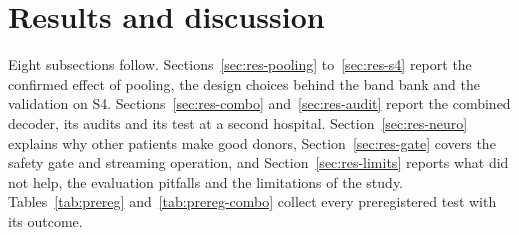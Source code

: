 \documentclass{ieeeaccess}
\begin{document}
\section{Results and discussion}\label{sec:results}

Eight subsections follow. Sections~\ref{sec:res-pooling} to~\ref{sec:res-s4} report the confirmed effect of pooling, the design choices behind the band bank and the validation on S4. Sections~\ref{sec:res-combo} and~\ref{sec:res-audit} report the combined decoder, its audits and its test at a second hospital. Section~\ref{sec:res-neuro} explains why other patients make good donors, Section~\ref{sec:res-gate} covers the safety gate and streaming operation, and Section~\ref{sec:res-limits} reports what did not help, the evaluation pitfalls and the limitations of the study. Tables~\ref{tab:prereg} and~\ref{tab:prereg-combo} collect every preregistered test with its outcome.
\end{document}
